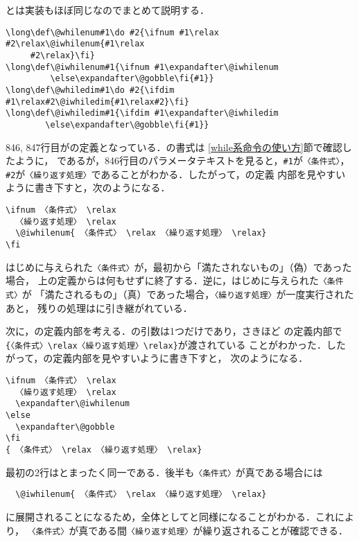 \documentclass[autodetect-engine,dvipdfmx]{jsarticle}
\begin{document}
とは実装もほぼ同じなのでまとめて説明する．
%
\latexltx
\begin{lstlisting}[firstnumber=846]
\long\def\@whilenum#1\do #2{\ifnum #1\relax #2\relax\@iwhilenum{#1\relax
     #2\relax}\fi}
\long\def\@iwhilenum#1{\ifnum #1\expandafter\@iwhilenum
         \else\expandafter\@gobble\fi{#1}}
\long\def\@whiledim#1\do #2{\ifdim #1\relax#2\@iwhiledim{#1\relax#2}\fi}
\long\def\@iwhiledim#1{\ifdim #1\expandafter\@iwhiledim
        \else\expandafter\@gobble\fi{#1}}
\end{lstlisting}
%
846, 847行目がの定義となっている．の書式は
\ref{while系命令の使い方}節で確認したように，
であるが，846行目のパラメータテキストを見ると，\verb|#1|が\texttt{〈条件式〉}，
\verb|#2|が\texttt{〈繰り返す処理〉}であることがわかる．したがって，の定義
内部を見やすいように書き下すと，次のようになる．
%
\texsource
\begin{lstlisting}
\ifnum 〈条件式〉 \relax
  〈繰り返す処理〉 \relax
  \@iwhilenum{ 〈条件式〉 \relax 〈繰り返す処理〉 \relax}
\fi
\end{lstlisting}
%
はじめに与えられた\texttt{〈条件式〉}が，最初から「満たされないもの」（偽）であった場合，
上の定義からは何もせずに終了する．逆に，はじめに与えられた\texttt{〈条件式〉}が
「満たされるもの」（真）であった場合，\texttt{〈繰り返す処理〉}が一度実行されたあと，
残りの処理はに引き継がれている．

次に，の定義内部を考える．の引数は1つだけであり，さきほど
の定義内部で\verb|{〈条件式〉\relax〈繰り返す処理〉\relax}|が渡されている
ことがわかった．したがって，の定義内部を見やすいように書き下すと，
次のようになる．
%
\begin{lstlisting}
\ifnum 〈条件式〉 \relax
  〈繰り返す処理〉 \relax
  \expandafter\@iwhilenum
\else
  \expandafter\@gobble
\fi
{ 〈条件式〉 \relax 〈繰り返す処理〉 \relax}
\end{lstlisting}
%
最初の2行はとまったく同一である．後半も\texttt{〈条件式〉}が真である場合には
%
\begin{lstlisting}
  \@iwhilenum{ 〈条件式〉 \relax 〈繰り返す処理〉 \relax}
\end{lstlisting}
%
に展開されることになるため，全体としてと同様になることがわかる．これにより，
\texttt{〈条件式〉}が真である間\texttt{〈繰り返す処理〉}が繰り返されることが確認できる．
\end{document}
